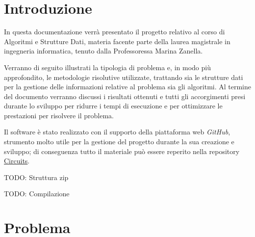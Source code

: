 
\def\mytitle{Circuits}
\def\myauthor{Riccardo Orizio}
\def\languages{italian}
\def\latexmode{memoir}
\def\tocdepth{2}
\def\documenttitle{Progetto di Algoritmi e Strutture Dati}
\def\formattedtitle{Simulazione e Diagnostica di Circuiti Digitali}
\def\registrationnumber{91956}
\def\supervisor{Prof.ssa Marina Zanella}
\def\university{Università degli Studi di Brescia}
\def\faculty{Dipartimento di Ingegneria dell'Informazione}
\def\course{Corso di Laurea Magistrale in Ingegneria
Informatica}
\def\academicyear{201x-201x}







\chapter{Introduzione}
\label{introduzione}

In questa documentazione verrà presentato il progetto relativo al corso di
Algoritmi e Strutture Dati, materia facente parte della laurea magistrale in
ingegneria informatica, tenuto dalla Professoressa Marina Zanella.

Verranno di seguito illustrati la tipologia di problema e, in modo più
approfondito, le metodologie risolutive utilizzate, trattando sia le strutture
dati per la gestione delle informazioni relative al problema sia gli algoritmi.
Al termine del documento verranno discussi i risultati ottenuti e tutti gli
accorgimenti presi durante lo sviluppo per ridurre i tempi di esecuzione e per
ottimizzare le prestazioni per risolvere il problema.

Il software è stato realizzato con il supporto della piattaforma web \emph{GitHub},
strumento molto utile per la gestione del progetto durante la sua creazione e
sviluppo; di conseguenza tutto il materiale può essere reperito nella repository
 \href{https://github.com/BoreaWolf/Circuits}{Circuits}.

TODO: Struttura zip

TODO: Compilazione




\chapter{Problema}
\label{problema}


